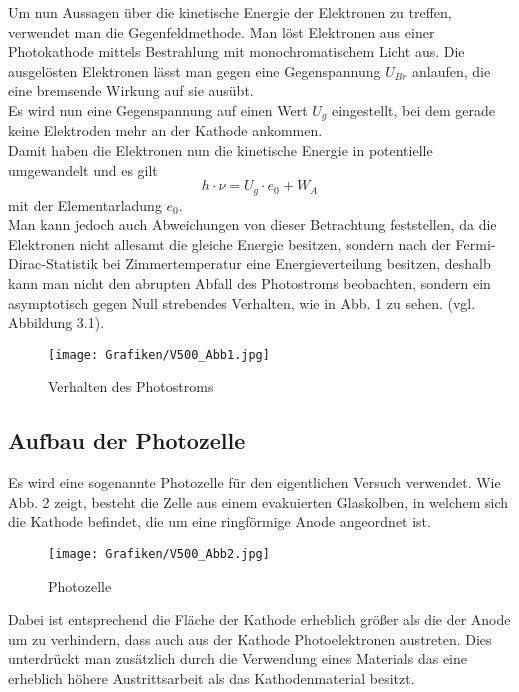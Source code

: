 Um nun Aussagen über die kinetische Energie der Elektronen zu treffen, verwendet man die Gegenfeldmethode. Man löst Elektronen aus einer Photokathode mittels Bestrahlung mit monochromatischem Licht aus. Die ausgelösten Elektronen lässt man gegen eine Gegenspannung $U_{Br}$ anlaufen, die eine bremsende Wirkung auf sie ausübt.\\
Es wird nun eine Gegenspannung auf einen Wert $U_g$ eingestellt, bei dem gerade keine Elektroden mehr an der Kathode ankommen.\\
Damit haben die Elektronen nun die kinetische Energie in potentielle umgewandelt und es gilt
\begin{equation}
h \cdot \nu = U_{g} \cdot e_0 + W_A
\end{equation}
mit der Elementarladung $e_0$.\\

Man kann jedoch auch Abweichungen von dieser Betrachtung feststellen, da die Elektronen nicht allesamt die gleiche Energie besitzen, sondern nach der Fermi-Dirac-Statistik bei Zimmertemperatur eine Energieverteilung besitzen, deshalb kann man nicht den abrupten Abfall des Photostroms beobachten, sondern ein asymptotisch gegen Null strebendes Verhalten, wie in Abb. 1 zu sehen. (vgl. Abbildung 3.1).
\begin{figure}[h]
	\centering
	\texttt{[image: Grafiken/V500\_Abb1.jpg]}
	\caption{Verhalten des Photostroms}
\end{figure}



\subsection{Aufbau der Photozelle}
Es wird eine sogenannte Photozelle für den eigentlichen Versuch verwendet. Wie Abb. 2 zeigt, besteht die Zelle aus einem evakuierten Glaskolben, in welchem sich die Kathode befindet, die um eine ringförmige Anode angeordnet ist.\\

\begin{figure}[h]
	\centering
	\texttt{[image: Grafiken/V500\_Abb2.jpg]}
	\caption{Photozelle}
\end{figure}
Dabei ist entsprechend die Fläche der Kathode erheblich größer als die der Anode um zu verhindern, dass auch aus der Kathode Photoelektronen austreten. Dies unterdrückt man zusätzlich durch die Verwendung eines Materials das eine erheblich höhere Austrittsarbeit als das Kathodenmaterial besitzt.\\

